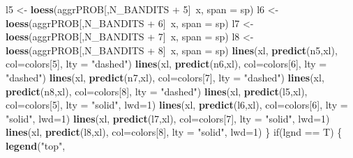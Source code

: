 \documentclass[11pt,,]{article}
\newenvironment{Shaded}{\begin{snugshade}}{\end{snugshade}}
\newcommand{\KeywordTok}[1]{\textcolor[rgb]{0.13,0.29,0.53}{\textbf{{#1}}}}
\newcommand{\DataTypeTok}[1]{\textcolor[rgb]{0.13,0.29,0.53}{{#1}}}
\newcommand{\DecValTok}[1]{\textcolor[rgb]{0.00,0.00,0.81}{{#1}}}
\newcommand{\StringTok}[1]{\textcolor[rgb]{0.31,0.60,0.02}{{#1}}}
\newcommand{\NormalTok}[1]{{#1}}
\begin{document}
\begin{Shaded}
\begin{Highlighting}[]
{{        \NormalTok{l5 <-}\StringTok{ }\KeywordTok{loess}\NormalTok{(aggrPROB[,N_BANDITS +}\StringTok{ }\DecValTok{5}\NormalTok{]~x, }\DataTypeTok{span =} \NormalTok{sp)}
        \NormalTok{l6 <-}\StringTok{ }\KeywordTok{loess}\NormalTok{(aggrPROB[,N_BANDITS +}\StringTok{ }\DecValTok{6}\NormalTok{]~x, }\DataTypeTok{span =} \NormalTok{sp)}
        \NormalTok{l7 <-}\StringTok{ }\KeywordTok{loess}\NormalTok{(aggrPROB[,N_BANDITS +}\StringTok{ }\DecValTok{7}\NormalTok{]~x, }\DataTypeTok{span =} \NormalTok{sp)}
        \NormalTok{l8 <-}\StringTok{ }\KeywordTok{loess}\NormalTok{(aggrPROB[,N_BANDITS +}\StringTok{ }\DecValTok{8}\NormalTok{]~x, }\DataTypeTok{span =} \NormalTok{sp)}
        \KeywordTok{lines}\NormalTok{(xl, }\KeywordTok{predict}\NormalTok{(n5,xl), }\DataTypeTok{col=}\NormalTok{colors[}\DecValTok{5}\NormalTok{], }\DataTypeTok{lty =} \StringTok{"dashed"}\NormalTok{)}
        \KeywordTok{lines}\NormalTok{(xl, }\KeywordTok{predict}\NormalTok{(n6,xl), }\DataTypeTok{col=}\NormalTok{colors[}\DecValTok{6}\NormalTok{], }\DataTypeTok{lty =} \StringTok{"dashed"}\NormalTok{)}
        \KeywordTok{lines}\NormalTok{(xl, }\KeywordTok{predict}\NormalTok{(n7,xl), }\DataTypeTok{col=}\NormalTok{colors[}\DecValTok{7}\NormalTok{], }\DataTypeTok{lty =} \StringTok{"dashed"}\NormalTok{)}
        \KeywordTok{lines}\NormalTok{(xl, }\KeywordTok{predict}\NormalTok{(n8,xl), }\DataTypeTok{col=}\NormalTok{colors[}\DecValTok{8}\NormalTok{], }\DataTypeTok{lty =} \StringTok{"dashed"}\NormalTok{)}
        \KeywordTok{lines}\NormalTok{(xl, }\KeywordTok{predict}\NormalTok{(l5,xl), }\DataTypeTok{col=}\NormalTok{colors[}\DecValTok{5}\NormalTok{], }\DataTypeTok{lty =} \StringTok{"solid"}\NormalTok{, }\DataTypeTok{lwd=}\DecValTok{1}\NormalTok{)}
        \KeywordTok{lines}\NormalTok{(xl, }\KeywordTok{predict}\NormalTok{(l6,xl), }\DataTypeTok{col=}\NormalTok{colors[}\DecValTok{6}\NormalTok{], }\DataTypeTok{lty =} \StringTok{"solid"}\NormalTok{, }\DataTypeTok{lwd=}\DecValTok{1}\NormalTok{)}
        \KeywordTok{lines}\NormalTok{(xl, }\KeywordTok{predict}\NormalTok{(l7,xl), }\DataTypeTok{col=}\NormalTok{colors[}\DecValTok{7}\NormalTok{], }\DataTypeTok{lty =} \StringTok{"solid"}\NormalTok{, }\DataTypeTok{lwd=}\DecValTok{1}\NormalTok{)}
        \KeywordTok{lines}\NormalTok{(xl, }\KeywordTok{predict}\NormalTok{(l8,xl), }\DataTypeTok{col=}\NormalTok{colors[}\DecValTok{8}\NormalTok{], }\DataTypeTok{lty =} \StringTok{"solid"}\NormalTok{, }\DataTypeTok{lwd=}\DecValTok{1}\NormalTok{)}
    \NormalTok{\}}
    \NormalTok{if(lgnd ==}\StringTok{ }\NormalTok{T) \{}
        \KeywordTok{legend}\NormalTok{(}\StringTok{"top"}\NormalTok{, }
}}
\end{Highlighting}
\end{Shaded}
\end{document}
